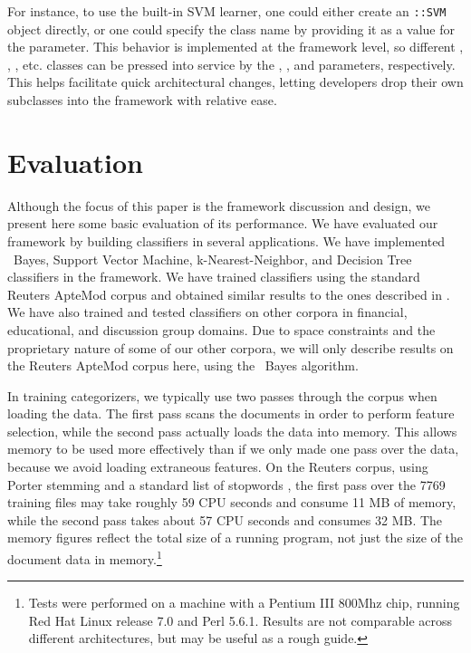 \begin{singlespace}
For instance, to use the built-in SVM learner, one could either create
an \aicat\texttt{::SVM} object directly, or one could specify
the class name by providing it as a value for the
 parameter.  This behavior is implemented at
the framework level, so different ,
, , etc. classes can be
pressed into service by the ,
, and 
parameters, respectively.  This helps facilitate quick architectural
changes, letting developers drop their own subclasses into the
framework with relative ease.


\section{Evaluation}

Although the focus of this paper is the framework discussion and
design, we present here some basic evaluation of its performance.
We have evaluated our framework by building classifiers in several
applications.  We have implemented \naive\ Bayes, Support Vector
Machine, k-Nearest-Neighbor, and Decision Tree classifiers in the
framework.  We have trained classifiers using the standard Reuters
ApteMod corpus and obtained similar results to the ones described in
\cite{yang:99}.  We have also trained and tested classifiers on other
corpora in financial, educational, and discussion group domains.  Due
to space constraints and the proprietary nature of some of our other
corpora, we will only describe results on the Reuters ApteMod corpus
here, using the \naive\ Bayes algorithm.

In training categorizers, we typically use two passes through the
corpus when loading the data.  The first pass scans the documents in
order to perform feature selection, while the second pass actually
loads the data into memory.  This allows memory to be used more
effectively than if we only made one pass over the data, because we
avoid loading extraneous features.  On the Reuters corpus, using
Porter stemming \cite{porter:80} and a standard list of stopwords
\cite{salton:89}, the first
pass over the 7769 training files may take roughly 59 CPU seconds and
consume 11 MB of memory, while the second pass takes about 57 CPU
seconds and consumes 32 MB\@.  The memory figures reflect the total
size of a running program, not just the size of the document data in
memory.\footnote{Tests were performed on a machine with a Pentium III
800Mhz chip, running Red Hat Linux release 7.0 and Perl 5.6.1.
Results are not comparable across different architectures, but may be
useful as a rough guide.}


\end{singlespace}
